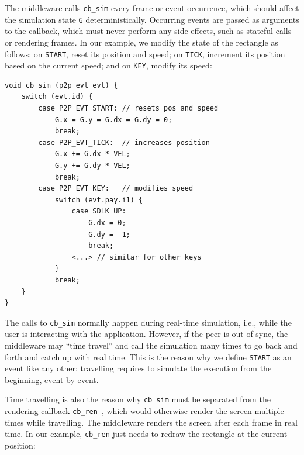\documentclass[12pt]{article}
\newcommand{\code}[1]  {\texttt{\small{#1}}}
\begin{document}

The middleware calls \code{cb\_sim} every frame or event occurrence, which
should affect the simulation state \code{G} deterministically.
Occurring events are passed as arguments to the callback, which must never
perform any side effects, such as stateful calls or rendering frames.
In our example, we modify the state of the rectangle as follows:
    on \code{START}, reset its position and speed;
    on \code{TICK},  increment its position based on the current speed; and
    on \code{KEY},   modify its speed:

{\footnotesize
\begin{verbatim}
void cb_sim (p2p_evt evt) {
    switch (evt.id) {
        case P2P_EVT_START: // resets pos and speed
            G.x = G.y = G.dx = G.dy = 0;
            break;
        case P2P_EVT_TICK:  // increases position
            G.x += G.dx * VEL;
            G.y += G.dy * VEL;
            break;
        case P2P_EVT_KEY:   // modifies speed
            switch (evt.pay.i1) {
                case SDLK_UP:
                    G.dx = 0;
                    G.dy = -1;
                    break;
                <...> // similar for other keys
            }
            break;
    }
}
\end{verbatim}
}

The calls to \code{cb\_sim} normally happen during real-time simulation, i.e.,
while the user is interacting with the application.
However, if the peer is out of sync, the middleware may ``time travel'' and
call the simulation many times to go back and forth and catch up with real
time.
This is the reason why we define \code{START} as an event like any other:
travelling requires to simulate the execution from the beginning, event by
event.


Time travelling is also the reason why \code{cb\_sim} must be separated from
the rendering callback \code{cb\_ren}~\cite{tml.js}, which would otherwise
render the screen multiple times while travelling.
The middleware renders the screen after each frame in real time.
In our example, \code{cb\_ren} just needs to redraw the rectangle at the
current position:
\end{document}
